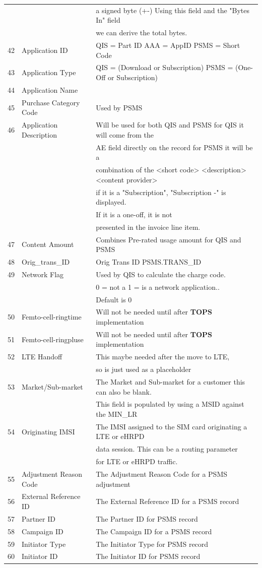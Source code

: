 \documentclass[12pt,twoside]{article}
\begin{document}
\begin{longtable}{c|l|l}
 &  & a signed byte (+-) Using this field and the "Bytes In" field\\
 &  & we can derive the total bytes.\\
42 & Application ID & QIS = Part ID AAA = AppID PSMS = Short Code\\
43 & Application Type & QIS = (Download or Subscription) PSMS = (One-Off or Subscription)\\
44 & Application Name & \\
45 & Purchase Category Code & Used by PSMS\\
46 & Application Description & Will be used for both QIS and PSMS for QIS it will come from the\\
 &  & AE field directly on the record for PSMS it will be a\\
 &  & combination of the <short code> <description> <content provider>\\
 &  & if it is a "Subscription", "Subscription -" is displayed.\\
 &  & If it is a one-off, it is not\\
 &  & presented in the invoice line item.\\
47 & Content Amount & Combines Pre-rated usage amount for QIS and PSMS\\
48 & Orig\_trans\_ID & Orig Trans ID PSMS.TRANS\_ID\\
49 & Network Flag & Used by QIS to calculate the charge code.\\
 &  & 0 = not a 1 = is a network application..\\
 &  & Default is 0\\
50 & Femto-cell-ringtime & Will not be needed until after \textbf{TOPS} implementation\\
51 & Femto-cell-ringpluse & Will not be needed until after \textbf{TOPS} implementation\\
52 & LTE Handoff & This maybe needed after the move to LTE,\\
 &  & so is just used as a placeholder\\
53 & Market/Sub-market & The Market and Sub-market for a customer this can also be blank.\\
 &  & This field is populated by using a MSID against the MIN\_LR\\
54 & Originating IMSI & The IMSI assigned to the SIM card originating a LTE or eHRPD\\
 &  & data session. This can be a routing parameter\\
 &  & for LTE or eHRPD traffic.\\
55 & Adjustment Reason Code & The Adjustment Reason Code for a PSMS adjustment\\
56 & External Reference ID & The External Reference ID for a PSMS record\\
57 & Partner ID & The Partner ID for PSMS record\\
58 & Campaign ID & The Campaign ID for a PSMS record\\
59 & Initiator Type & The Initiator Type for PSMS record\\
60 & Initiator ID & The Initiator ID for PSMS record\\
\hline
\end{longtable}
\normalsize
\end{document}
